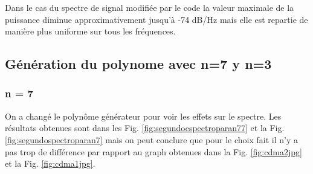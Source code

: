 \documentclass{report}
\begin{document}
Dans le cas du spectre de signal modifiée par le code la valeur maximale de la puissance diminue approximativement jusqu'à -74 dB/Hz  mais elle est repartie de manière plus uniforme sur tous les fréquences.

\subsection{Génération du polynome avec n=7 y n=3}

\subsubsection{n = 7}

On a changé le polynôme générateur pour voir les effets sur le spectre. Les résultats obtenues sont dans les Fig. \ref{fig:segundoespectroparan77} et la Fig. \ref{fig:segundospectroparan7} mais on peut conclure que pour le choix fait
il n'y a pas trop de différence par rapport au graph obtenues dans la Fig. \ref{fig:cdma2jpg} et la Fig. \ref{fig:cdma1jpg}.
\end{document}
